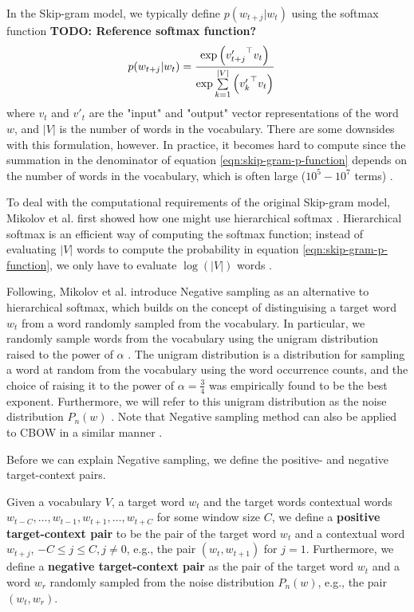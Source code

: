 \noindent
In the Skip-gram model, we typically define $p(w_{t+j} | w_t)$ using the softmax function \cite{mikolov2013b} \textbf{TODO: Reference softmax function?}
\begin{align}
    p(w_{t+j} | w_t)
    &= \frac{\exp{ \left( {v'_{t+j}}^\top v_t \right) }} {\exp{  \sum\limits_{k=1}^{|V|} \left( {v'_k}^\top v_t \right) }}
    \label{eqn:skip-gram-p-function}
\end{align}
where $v_t$ and $v'_t$ are the "input" and "output" vector representations of the word $w$, and $|V|$ is the number of words in the vocabulary. There are some downsides with this formulation, however. In practice, it becomes hard to compute since the summation in the denominator of equation \ref{eqn:skip-gram-p-function} depends on the number of words in the vocabulary, which is often large ($10^5 - 10^7$ terms) \cite{mikolov2013b}.

\noindent
To deal with the computational requirements of the original Skip-gram model, Mikolov et al. first showed how one might use hierarchical softmax \cite{mikolov2013b}. Hierarchical softmax is an efficient way of computing the softmax function; instead of evaluating $|V|$ words to compute the probability in equation \ref{eqn:skip-gram-p-function}, we only have to evaluate $\log \left( |V| \right)$ words \cite{mikolov2013b}.

\noindent
Following, Mikolov et al. introduce Negative sampling as an alternative to hierarchical softmax, which builds on the concept of distinguising a target word $w_t$ from a word randomly sampled from the vocabulary. In particular, we randomly sample words from the vocabulary using the unigram distribution raised to the power of $\alpha$ \cite{mikolov2013b}. The unigram distribution is a distribution for sampling a word at random from the vocabulary using the word occurrence counts, and the choice of raising it to the power of $\alpha = \frac{3}{4}$ was empirically found to be the best exponent. Furthermore, we will refer to this unigram distribution as the noise distribution $P_n(w)$ \cite{mikolov2013b}. Note that Negative sampling method can also be applied to CBOW in a similar manner \cite{mikolov2013b}.

\noindent
Before we can explain Negative sampling, we define the positive- and negative target-context pairs.
\begin{definition}
Given a vocabulary $V$, a target word $w_t$ and the target words contextual words $w_{t-C}, \ldots, w_{t-1}, w_{t+1}, \ldots, w_{t+C}$ for some window size $C$, we define a \textbf{positive target-context pair} to be the pair of the target word $w_t$ and a contextual word $w_{t+j}$, $-C \leq j \leq C, j \neq 0$, e.g., the pair $\left( w_t, w_{t+1} \right)$ for $j=1$. Furthermore, we define a \textbf{negative target-context pair} as the pair of the target word $w_t$ and a word $w_r$ randomly sampled from the noise distribution $P_n(w)$, e.g., the pair $\left( w_t, w_r \right)$.
\end{definition}

